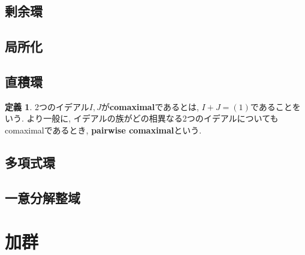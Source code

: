 \documentclass[a4paper, twoside]{bxjsarticle}
\newcommand{\tb}{\textbf}
\theoremstyle{definition}
\newtheorem{defn}[thm]{定義}
\begin{document}
        \subsection{剰余環}
        \subsection{局所化}
        \subsection{直積環}
        \begin{defn}
            2つのイデアル$I, J$が\tb{comaximal}であるとは, $I+J=(1)$であることをいう. より一般に, イデアルの族がどの相異なる2つのイデアルについてもcomaximalであるとき, \tb{pairwise comaximal}という.
        \end{defn}
        \subsection{多項式環}
        \subsection{一意分解整域}

    \cleardoublepage
    \section{加群}
\end{document}
